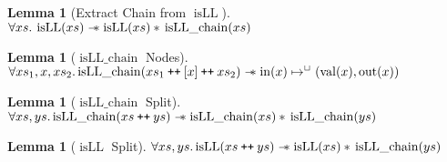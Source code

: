 \documentclass[a4paper, 10pt]{report}
\theoremstyle{definition}
\newtheorem{lemma}[theorem]{Lemma}
\newcommand{\isLLchain}{\operatorname{isLL\_chain}}
\newcommand{\isLL}{\operatorname{isLL}}
\newcommand{\nIn}[1]{\operatorname{in}(#1)}
\newcommand{\nVal}[1]{\operatorname{val}(#1)}
\newcommand{\nOut}[1]{\operatorname{out}(#1)}
\newcommand\catenate{\mathbin{\text{\ttfamily\upshape ++}}}
\newcommand{\isNode}[1]{\nIn{#1} \mapsto^{\persistently} (\nVal{#1}, \nOut{#1})}
\begin{document}
\begin{lemma}[Extract Chain from $\isLL$]\label{lemma:isLL-and-chain}
  $\All xs. \isLL(xs) \wand \isLL(xs) \star{} \isLLchain(xs)$
\end{lemma}

\begin{lemma}[$\isLLchain$ Nodes]\label{lemma:isLL-chain-nodes}
  $\All xs_1, x, xs_2.\\
   \isLLchain(xs_1 \catenate [x] \catenate xs_2) \wand \isNode{x}$
\end{lemma}

\begin{lemma}[$\isLLchain$ Split]\label{lemma:isLL-chain-split}
  $\All xs, ys.\\
   \isLLchain(xs \catenate ys) \wand \isLLchain(xs) \star{} \isLLchain(ys)$
\end{lemma}

\begin{lemma}[$\isLL$ Split]\label{lemma:isLL-split}
  $\All xs, ys.\\
   \isLL(xs \catenate ys) \wand \isLL(xs) \star{} \isLLchain(ys)$
\end{lemma}
\end{document}
